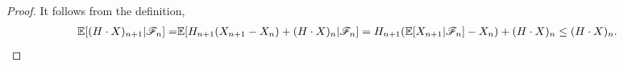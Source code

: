 \documentclass[a4paper,10pt,english]{article}
\begin{document}
\begin{proof}
It follows from the definition, 
\begin{align*}
\mathbb{E}[(H\cdot X)_{n+1}|\mathscr{F}_n]=&\mathbb{E}[H_{n+1}(X_{n+1}-X_n)+(H\cdot X)_n|\mathscr{F}_n] = H_{n+1}(\mathbb{E}[X_{n+1}|\mathscr{F}_n]-X_n)+(H\cdot X)_n \leq (H\cdot X)_n.
\end{align*}
\end{proof}
\end{document}
